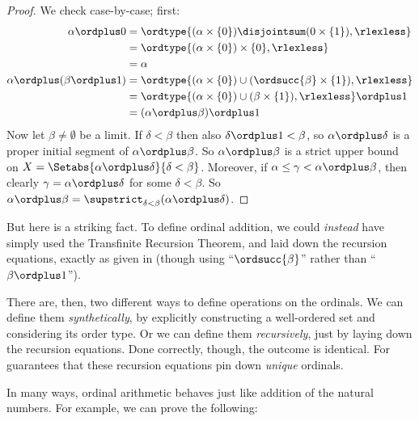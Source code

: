 \documentclass[../../../include/open-logic-section]{subfiles}
\begin{document}
\begin{proof}
We check case-by-case; first:
\begin{align*}
	\alpha \ordplus  0 
	& = \ordtype{(\alpha \times \{0\}) \disjointsum (0 \times \{1\}), \rlexless} \\
	&= \ordtype{(\alpha \times \{0\})\times\{0\}, \rlexless}\\
	&= \alpha\\
	\alpha \ordplus (\beta \ordplus  1) 
	&= \ordtype{(\alpha\times \{0\}) \cup (\ordsucc{\beta}\times \{1\}), \rlexless} \\
	&= \ordtype{(\alpha\times \{0\}) \cup (\beta \times \{1\}), \rlexless} \ordplus 1\\
	&= (\alpha \ordplus  \beta) \ordplus  1
\end{align*}
Now let $\beta \neq \emptyset$ be a limit. If $\delta < \beta$ then
also $\delta\ordplus 1 < \beta$, so $\alpha \ordplus  \delta$ is a
proper initial segment of $\alpha \ordplus  \beta$. So $\alpha
\ordplus  \beta$ is a strict upper bound on $X = \Setabs{\alpha
\ordplus  \delta}{\delta < \beta}$. Moreover, if $\alpha \leq \gamma <
\alpha \ordplus  \beta$, then clearly $\gamma = \alpha \ordplus
\delta$ for some $\delta < \beta$. So $\alpha \ordplus  \beta =
\supstrict_{\delta< \beta}(\alpha\ordplus \delta)$.
\end{proof}

But here is a striking fact. To define ordinal addition, we could
\emph{instead} have simply used the Transfinite Recursion Theorem, and
laid down the recursion equations, exactly as given in
 (though using ``$\ordsucc{\beta}$''
rather than ``$\beta \ordplus 1$'').

There are, then, two different ways to define operations on the
ordinals. We can define them \emph{synthetically}, by explicitly
constructing a well-ordered set and considering its order type. Or we
can define them \emph{recursively}, just by laying down the recursion
equations. Done correctly, though, the outcome is identical. For
 guarantees
that these recursion equations pin down \emph{unique} ordinals.

In many ways, ordinal arithmetic behaves just like addition of the
natural numbers. For example, we can prove the following:
\end{document}
